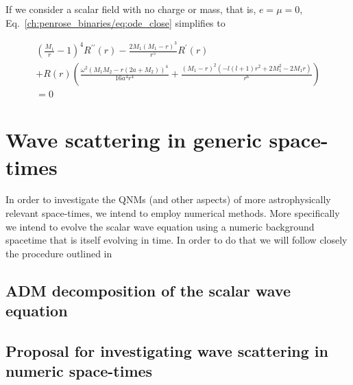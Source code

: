 If we consider a scalar field with no charge or mass, that is, $e = \mu = 0$, Eq.~\eqref{ch:penrose_binaries/eq:ode_close} simplifies to

\begin{multline}
  \left(\frac{M_1}{r}-1\right)^4 R^{\prime\prime}(r) - \frac{2 M_1 (M_1-r)^3}{r^5}R^\prime(r) \\
  + R(r) \left( \frac{\omega ^2 (M_1 M_2-r (2 a+M_2))^4}{16 a^4 r^4}+\frac{(M_1-r)^2 \left(-l (l+1) r^2+2 M_1^2-2 M_1 r\right)}{r^6} \right) \\
  = 0
  \label{ch:penrose_binaries/eq:ode_far_no_charge_no_mass}
\end{multline}

\section{Wave scattering in generic space-times}

In order to investigate the QNMs (and other aspects) of more astrophysically relevant space-times, we intend to employ numerical methods. More specifically we intend to evolve the scalar wave equation using a numeric background spacetime that is itself evolving in time. In order to do that we will follow closely the procedure outlined in ~\cite{ASSUMPCAO2018}

\subsection{ADM decomposition of the scalar wave equation}
\subsection{Proposal for investigating wave scattering in numeric space-times}